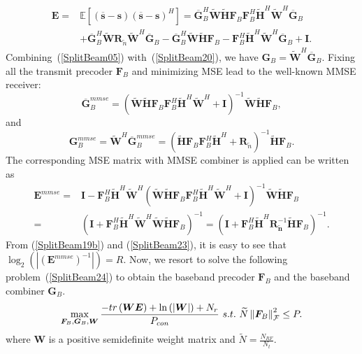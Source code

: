\documentclass[11pt,draftcls,onecolumn]{IEEEtran}
\begin{document}
\begin{equation}\label{SplitBeam20}
\begin{split}
\bm{E}=&\mathbb{E}\left[\left(\overline{\bm{s}}-\bm{s}\right)\left(\overline{\bm{s}}-\bm{s}\right)^{H}\right]
=\overline{\bm{G}}_{B}^{H}\widetilde{\bm{W}}\widetilde{\bm{H}}\bm{F}_{B}\bm{F}_{B}^{H}\widetilde{\bm{H}}^{H}\widetilde{\bm{W}}^{H}
\overline{\bm{G}}_{B}\\
&+\overline{\bm{G}}_{B}^{H}\widetilde{\bm{W}}\bm{R}_{\widetilde{n}}\widetilde{\bm{W}}^{H}\overline{\bm{G}}_{B}
-\overline{\bm{G}}_{B}^{H}\widetilde{\bm{W}}\widetilde{\bm{H}}\bm{F}_{B}-\bm{F}_{B}^{H}\widetilde{\bm{H}}^{H}
\widetilde{\bm{W}}^{H}\overline{\bm{G}}_{B}+\bm{I}.
\end{split}
\end{equation}
Combining~(\ref{SplitBeam05}) with~(\ref{SplitBeam20}), we have $\bm{G}_{B}=\widetilde{\bm{W}}^{H}\overline{\bm{G}}_{B}$. Fixing all the transmit precoder $\bm{F}_{B}$ and minimizing MSE lead to the well-known MMSE receiver:
\begin{equation}\label{SplitBeam21}
\overline{\bm{G}}_{B}^{mmse}=\left(\widetilde{\bm{W}}\widetilde{\bm{H}}\bm{F}_{B}\bm{F}_{B}^{H}\widetilde{\bm{H}}^{H}\widetilde{\bm{W}}^{H}+
\bm{I}\right)^{-1}\widetilde{\bm{W}}\widetilde{\bm{H}}\bm{F}_{B},
\end{equation}
and
\begin{equation}\label{SplitBeam22}
\bm{G}_{B}^{mmse}=\widetilde{\bm{W}}^{H}\overline{\bm{G}}_{B}^{mmse}=\left(\widetilde{\bm{H}}\bm{F}_{B}\bm{F}_{B}^{H}\widetilde{\bm{H}}^{H}+
\bm{R}_{\widetilde{n}}\right)^{-1}\widetilde{\bm{H}}\bm{F}_{B}.
\end{equation}
The corresponding MSE matrix with MMSE combiner is applied can be written as
\begin{equation}\label{SplitBeam23}
\begin{split}
\bm{E}^{mmse}=&\bm{I}-\bm{F}_{B}^{H}\widetilde{\bm{H}}^{H}\widetilde{\bm{W}}^{H}\left(\widetilde{\bm{W}}\widetilde{\bm{H}}
\bm{F}_{B}\bm{F}_{B}^{H}\widetilde{\bm{H}}^{H}\widetilde{\bm{W}}^{H}+
\bm{I}\right)^{-1}\widetilde{\bm{W}}\widetilde{\bm{H}}\bm{F}_{B}\\
=&\left(\bm{I}+\bm{F}_{B}^{H}\widetilde{\bm{H}}^{H}\widetilde{\bm{W}}^{H}\widetilde{\bm{W}}\widetilde{\bm{H}}\bm{F}_{B}\right)^{-1}
=\left(\bm{I}+\bm{F}_{B}^{H}\widetilde{\bm{H}}^{H}\bm{R}_{\widetilde{\bm{n}}}^{-1}\widetilde{\bm{H}}\bm{F}_{B}\right)^{-1}.
\end{split}
\end{equation}
From (\ref{SplitBeam19b}) and (\ref{SplitBeam23}), it is easy to see that $\log_{2}\left(\left|\left(\bm{E}^{mmse}\right)^{-1}\right|\right)=R$. Now, we resort to solve the following problem~(\ref{SplitBeam24}) to obtain the baseband precoder $\bm{F}_{B}$ and the baseband combiner $\bm{G}_{B}$.
\begin{equation}\label{SplitBeam24}
\max_{\bm{F}_{B},\bm{G}_{B},\bm{W}}\frac{-tr\left(\bm{W}\bm{E}\right)+\ln\left(\left|\bm{W}\right|\right)+N_{r}}{P_{con}}\\
~s.t.~\widetilde{N}\left\|\bm{F}_{B}\right\|_{\mathcal{F}}^{2}\leq P.
\end{equation}
where $\bm{W}$ is a positive semidefinite weight matrix and $\widetilde{N}=\frac{N_{RF}}{N_{t}}$.
\end{document}
